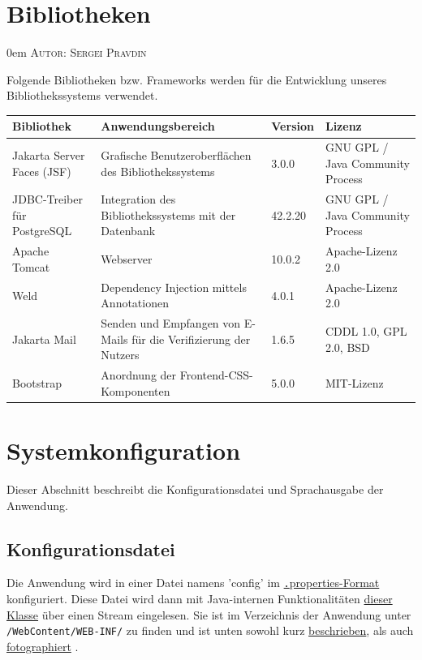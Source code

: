 \documentclass{article}
\makeatletter
\newcommand{\sectionauthor}[1]{
	{\parindent 0em \large \scshape Autor: #1 \par \nobreak \vspace*{1em}}
	\@afterheading
}
\makeatother
\begin{document}
\section{Bibliotheken}
\sectionauthor{Sergei Pravdin}

\newenvironment{controls}
{
    \begin{table}[H]
        \centering
        \begin{tabular}{ p{7em} p{19em} p{4em} p{12em} }
            \toprule
            \textbf{Bibliothek} & \textbf{Anwendungsbereich} & \textbf{Version} & \textbf{Lizenz}\\
            \midrule
        }
        {
            \bottomrule
        \end{tabular}
    \end{table}
}

Folgende Bibliotheken bzw. Frameworks werden für die Entwicklung unseres Bibliothekssystems verwendet.

\begin{controls}
    Jakarta Server Faces (JSF) & Grafische Benutzeroberflächen des Bibliothekssystems & 3.0.0 & GNU GPL / Java Community Process\\
    JDBC-Treiber für PostgreSQL & Integration des Bibliothekssystems mit der Datenbank & 42.2.20 & GNU GPL / Java Community Process\\
    Apache Tomcat & Webserver & 10.0.2 & Apache-Lizenz 2.0\\
    Weld & Dependency Injection mittels Annotationen & 4.0.1 & Apache-Lizenz 2.0\\
    Jakarta Mail & Senden und Empfangen von E-Mails für die Verifizierung der Nutzers & 1.6.5 & CDDL 1.0, GPL 2.0, BSD\\
    Bootstrap & Anordnung der Frontend-CSS-Komponenten & 5.0.0 & MIT-Lizenz\\
\end{controls}

\section{Systemkonfiguration}
Dieser Abschnitt beschreibt die Konfigurationsdatei und Sprachausgabe der Anwendung.
\subsection{Konfigurationsdatei}
\indent Die Anwendung wird in einer Datei namens 'config' im \hyperlink{https://de.wikipedia.org/wiki/Java-Properties-Datei}{{\texttt.properties}-Format} konfiguriert. Diese Datei wird dann mit Java-internen Funktionalitäten \hyperlink{https://docs.oracle.com/javase/7/docs/api/java/util/Properties.html}{dieser Klasse} über einen Stream eingelesen. Sie ist im Verzeichnis der Anwendung unter \texttt{/WebContent/WEB-INF/} zu finden und ist unten sowohl kurz \hyperlink{configTabelle}{beschrieben}, als auch \hyperlink{configFoto}{fotographiert} .
\end{document}
